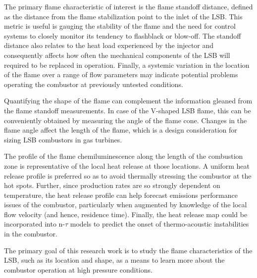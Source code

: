 The primary flame characteristic of interest is the flame standoff distance, defined as the distance from the flame stabilization point to the inlet of the LSB.
This metric is useful is gauging the stability of the flame and the need for control systems to closely monitor its tendency to flashblack or blow-off.
The standoff distance also relates to the heat load experienced by the injector and consequently affects how often the mechanical components of the LSB will required to be replaced in operation.
Finally, a systemic variation in the location of the flame over a range of flow parameters may indicate potential problems operating the combustor at previously untested conditions.

Quantifying the shape of the flame can complement the information gleaned from the flame standoff measurements.
In case of the V-shaped LSB flame, this can be conveniently obtained by measuring the angle of the flame cone.
Changes in the flame angle affect the length of the flame, which is a design consideration for sizing LSB combustors in gas turbines.

The profile of the flame chemiluminescence along the length of the combustion zone is representative of the local heat release at those locations.
A uniform heat release profile is preferred so as to avoid thermally stressing the combustor at the hot spots.
Further, since  production rates are so strongly dependent on temperature, the heat release profile can help forecast emissions performance issues of the combustor, particularly when augmented by knowledge of the local flow velocity (and hence, residence time).
Finally, the heat release map could be incorporated into n-\(\tau\) models to predict the onset of thermo-acoustic instabilities in the combustor.

The primary goal of this research work is to study the flame characteristics of the LSB, such as its location and shape, as a means to learn more about the combustor operation at high pressure conditions.

